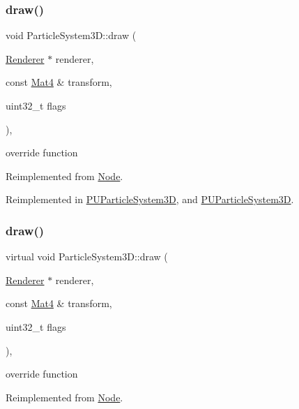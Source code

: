 \subsubsection{\texorpdfstring{draw()}{draw()}\hspace{0.1cm}{\footnotesize\ttfamily [1/2]}}
{\footnotesize\ttfamily void Particle\+System3\+D\+::draw (\begin{DoxyParamCaption}\item[{\hyperlink{classRenderer}{Renderer} $\ast$}]{renderer,  }\item[{const \hyperlink{classMat4}{Mat4} \&}]{transform,  }\item[{uint32\+\_\+t}]{flags }\end{DoxyParamCaption})\hspace{0.3cm}{\ttfamily [override]}, {\ttfamily [virtual]}}

override function 

Reimplemented from \hyperlink{classNode_abcf85087a15901deb7c6c1231634c8ab}{Node}.



Reimplemented in \hyperlink{classPUParticleSystem3D_a46c2d79b09fcac96e81be307f9148fea}{P\+U\+Particle\+System3D}, and \hyperlink{classPUParticleSystem3D_ac4ab268d41e408ba4c2636827717cf48}{P\+U\+Particle\+System3D}.

\mbox{\label{classParticleSystem3D_af039c3af0d3805791c65c58d9abccc8a}} 
\subsubsection{\texorpdfstring{draw()}{draw()}\hspace{0.1cm}{\footnotesize\ttfamily [2/2]}}
{\footnotesize\ttfamily virtual void Particle\+System3\+D\+::draw (\begin{DoxyParamCaption}\item[{\hyperlink{classRenderer}{Renderer} $\ast$}]{renderer,  }\item[{const \hyperlink{classMat4}{Mat4} \&}]{transform,  }\item[{uint32\+\_\+t}]{flags }\end{DoxyParamCaption})\hspace{0.3cm}{\ttfamily [override]}, {\ttfamily [virtual]}}

override function 

Reimplemented from \hyperlink{classNode_abcf85087a15901deb7c6c1231634c8ab}{Node}.



